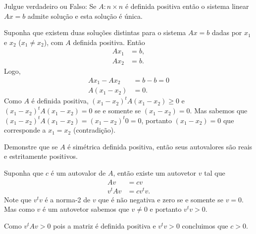 \documentclass[a4paper,12pt, leqno, answers]{exam}
\begin{document}
\begin{questions}
    \question Julgue verdadeiro ou Falso: Se $A : n \times n$ \'{e} definida positiva ent\~{a}o o sistema linear $A x = b$ admite solu\c{c}\~{a}o e esta solu\c{c}\~{a}o \'{e} \'{u}nica.
    \begin{solution}
        Suponha que existem duas solu\c{c}\~{o}es distintas para o sistema $A x = b$ dadas por $x_1$ e $x_2$ ($x_1 \neq x_2$), com $A$ definida positiva. Ent\~{a}o
        \begin{align*}
            A x_1 &= b, \\
            A x_2 &= b.
        \end{align*}
        Logo,
        \begin{align*}
            A x_1 - A x_2 &= b - b = 0 \\
            A (x_1 - x_2) &= 0.
        \end{align*}
        Como $A$ \'{e} definida positiva, $(x_1 - x_2)^t A (x_1 - x_2) \geq 0$ e $(x_1 - x_2)^t A (x_1 - x_2) = 0$ se e somente se $(x_1 - x_2) = 0$. Mas sabemos que $(x_1 - x_2)^t A (x_1 - x_2) = (x_1 - x_2)^t 0 = 0$, portanto $(x_1 - x_2) = 0$ que corresponde a $x_1 = x_2$ (contradi\c{c}\~{a}o).
    \end{solution}

    \question Demonstre que se $A$ \'{e} sim\'{e}trica definida positiva, ent\~{a}o seus autovalores s\~{a}o reais e estritamente positivos.
    \begin{solution}
        Suponha que $c$ \'{e} um autovalor de $A$, ent\~{a}o existe um autovetor $v$ tal que
        \begin{align*}
            A v &= c v \\
            v^t A v &= c v^t v.
        \end{align*}
        Note que $v^t v$ \'{e} a norma-2 de $v$ que \'{e} n\~{a}o negativa e zero se e somente se $v = 0$. Mas como $v$ \'{e} um autovetor sabemos que $v \neq 0$ e portanto $v^t v > 0$.

        Como $v^t A v > 0$ pois a matriz \'{e} definida positiva e $v^t v > 0$ concluimos que $c > 0$.
    \end{solution}


\end{questions}
\end{document}
